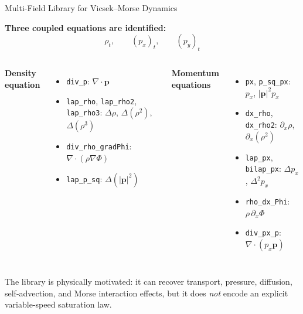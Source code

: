 \begin{frame}[shrink=10]{Multi-Field Library for Vicsek--Morse Dynamics}
\small

\textbf{Three coupled equations are identified:}
\[
  \rho_t,\qquad (p_x)_t,\qquad (p_y)_t
\]

\medskip
\begin{columns}[T]
{\small
\textbf{Density equation}
\begin{itemize}
  \item \texttt{div\_p}: $\nabla\!\cdot \mathbf{p}$
  \item \texttt{lap\_rho}, \texttt{lap\_rho2}, \texttt{lap\_rho3}: $\Delta\rho$, $\Delta(\rho^2)$, $\Delta(\rho^3)$
  \item \texttt{div\_rho\_gradPhi}: $\nabla\!\cdot(\rho\nabla\Phi)$
  \item \texttt{lap\_p\_sq}: $\Delta(|\mathbf{p}|^2)$
\end{itemize}
}

{\small
\textbf{Momentum equations}
\begin{itemize}
  \item \texttt{px}, \texttt{p\_sq\_px}: $p_x$, $|\mathbf{p}|^2p_x$
  \item \texttt{dx\_rho}, \texttt{dx\_rho2}: $\partial_x\rho$, $\partial_x(\rho^2)$
  \item \texttt{lap\_px}, \texttt{bilap\_px}: $\Delta p_x$, $\Delta^2 p_x$
  \item \texttt{rho\_dx\_Phi}: $\rho\,\partial_x\Phi$
  \item \texttt{div\_px\_p}: $\nabla\!\cdot(p_x\mathbf{p})$
\end{itemize}
}
\end{columns}

\medskip
The library is physically motivated: it can recover transport,
pressure, diffusion, self-advection, and Morse interaction effects, but
it does \emph{not} encode an explicit variable-speed saturation law.
\end{frame}

